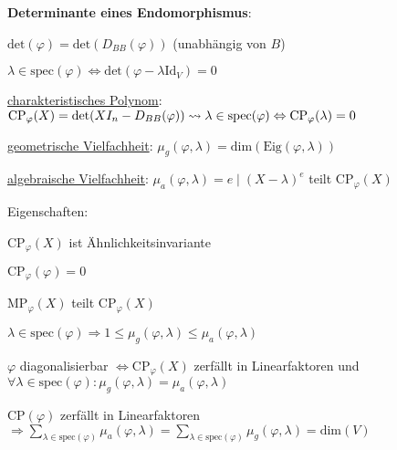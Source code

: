 \textbf{Determinante eines Endomorphismus}:	
\begin{items}
	\item $\text{det}(\varphi) = \text{det}(D_{BB}(\varphi))$ (unabhängig von $B$)
	\item $\lambda \in \text{spec}(\varphi) \Leftrightarrow \text{det}(\varphi - \lambda \text{Id}_V) = 0$
	\item \underline{charakteristisches Polynom}: $\text{CP}_\varphi(X)=\text{det}(XI_n - D_{BB}(\varphi)) \\* \leadsto \lambda \in \text{spec}(\varphi) \Leftrightarrow \text{CP}_\varphi(\lambda)=0$
	\item \underline{geometrische Vielfachheit}: $\mu_g(\varphi, \lambda) = \text{dim}(\text{Eig}(\varphi, \lambda))$
	\item \underline{algebraische Vielfachheit}: $\mu_a(\varphi, \lambda) = e \mid (X-\lambda)^e$ teilt $\text{CP}_\varphi(X)$
	\item Eigenschaften:
	\begin{enumeration}
		\item $\text{CP}_\varphi(X)$ ist Ähnlichkeitsinvariante
		\item $\text{CP}_\varphi(\varphi) = 0$
		\item $\text{MP}_\varphi(X)$ teilt $\text{CP}_\varphi(X)$
		\item $\lambda \in \text{spec}(\varphi) \Rightarrow 1 \leq \mu_g(\varphi, \lambda) \leq \mu_a(\varphi, \lambda)$
		\item $\varphi$ diagonalisierbar $\Leftrightarrow \text{CP}_\varphi(X)$ zerfällt in Linearfaktoren und $\forall \lambda \in \text{spec}(\varphi): \mu_g(\varphi, \lambda) = \mu_a(\varphi, \lambda)$
		\item $\text{CP}(\varphi)$ zerfällt in Linearfaktoren $\Rightarrow \sum_{\lambda \in \text{spec}(\varphi)} \mu_a(\varphi, \lambda) = \sum_{\lambda \in \text{spec}(\varphi)} \mu_g(\varphi, \lambda) = \text{dim}(V)$
	\end{enumeration}
\end{items}